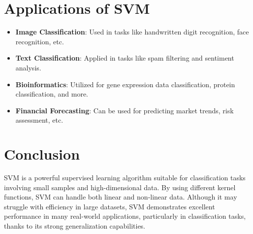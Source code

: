 \documentclass{article}
\begin{document}
	\section{Applications of SVM}
	
	\begin{itemize}
		\item \textbf{Image Classification}: Used in tasks like handwritten digit recognition, face recognition, etc.
		\item \textbf{Text Classification}: Applied in tasks like spam filtering and sentiment analysis.
		\item \textbf{Bioinformatics}: Utilized for gene expression data classification, protein classification, and more.
		\item \textbf{Financial Forecasting}: Can be used for predicting market trends, risk assessment, etc.
	\end{itemize}
	
	\section{Conclusion}
	
	SVM is a powerful supervised learning algorithm suitable for classification tasks involving small samples and high-dimensional data. By using different kernel functions, SVM can handle both linear and non-linear data. Although it may struggle with efficiency in large datasets, SVM demonstrates excellent performance in many real-world applications, particularly in classification tasks, thanks to its strong generalization capabilities.
	
\end{document}
